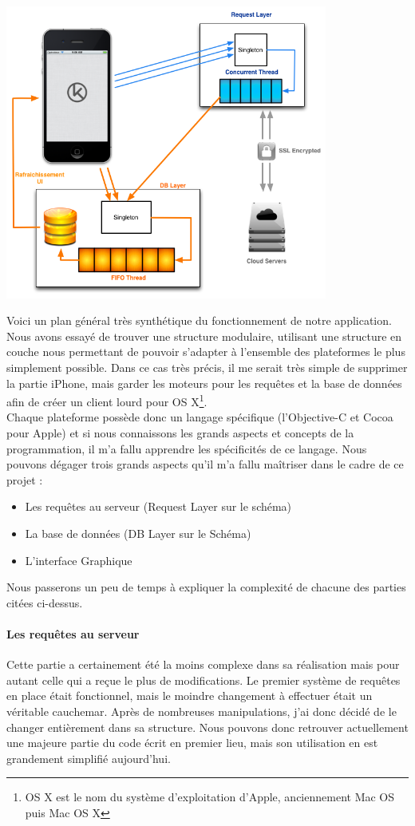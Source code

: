 \documentclass{article}
\begin{document}
\includegraphics[width=400px]{Images/schema_general_simplifie.png}

Voici un plan général très synthétique du fonctionnement de notre application. Nous avons essayé de trouver une structure modulaire, utilisant une structure en couche nous permettant de pouvoir s'adapter à l'ensemble des plateformes le plus simplement possible. Dans ce cas très précis, il me serait très simple de supprimer la partie iPhone, mais garder les moteurs pour les requêtes et la base de données afin de créer un client lourd pour OS X\footnote{OS X est le nom du système d'exploitation d'Apple, anciennement Mac OS puis Mac OS X}.\\

Chaque plateforme possède donc un langage spécifique (l'Objective-C et Cocoa pour Apple) et si nous connaissons les grands aspects et concepts de la programmation, il m'a fallu apprendre les spécificités de ce langage. Nous pouvons dégager trois grands aspects qu'il m'a fallu maîtriser dans le cadre de ce projet : 


\begin{itemize}
	\item Les requêtes au serveur (Request Layer sur le schéma)
	\item La base de données (DB Layer sur le Schéma)
	\item L'interface Graphique\\
\end{itemize}
Nous passerons un peu de temps à expliquer la complexité de chacune des parties citées ci-dessus.
		\paragraph{Les requêtes au serveur}
		Cette partie a certainement été la moins complexe dans sa réalisation mais pour autant celle qui a  re\c cue le plus de modifications. Le premier système de requêtes en place était fonctionnel, mais le moindre changement à effectuer était un véritable cauchemar. Après de nombreuses manipulations, j'ai donc décidé de le changer entièrement dans sa structure. Nous pouvons donc retrouver actuellement une majeure partie du code écrit en premier lieu, mais son utilisation en est grandement simplifié aujourd'hui.\\
		
\end{document}
